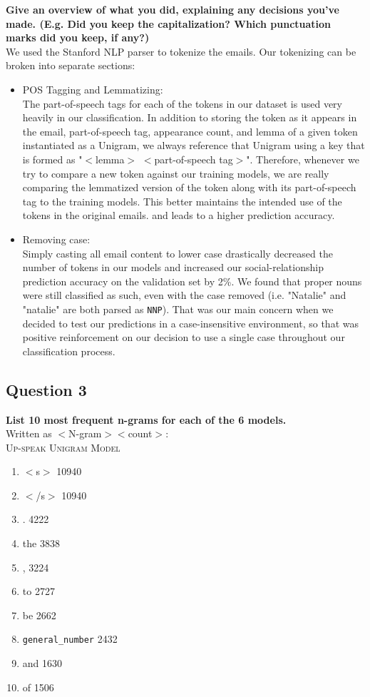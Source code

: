 \documentclass{article} %
\begin{document}
\textbf{Give an overview of what you did, explaining any decisions you've made. (E.g. Did you keep the capitalization? Which punctuation marks did you keep, if any?)}
\\


We used the Stanford NLP parser to tokenize the emails. Our tokenizing can be broken into separate sections:\\
\begin{itemize}
\item POS Tagging and Lemmatizing:\\
The part-of-speech tags for each of the tokens in our dataset is used very heavily in our classification. In addition to storing the token as it appears in the email, part-of-speech tag, appearance count, and lemma of a given token instantiated as a Unigram, we always reference that Unigram using a key that is formed as "$<$lemma$>$ $<$part-of-speech tag$>$". Therefore, whenever we try to compare a new token against our training models, we are really comparing the lemmatized version of the token along with its part-of-speech tag to the training models. This better maintains the intended use of the tokens in the original emails. and leads to a higher prediction accuracy.
\item Removing case:\\
Simply casting all email content to lower case drastically decreased the number of tokens in our models and increased our social-relationship prediction accuracy on the validation set by 2\%. We found that proper nouns were still classified as such, even with the case removed (i.e. "Natalie" and "natalie" are both parsed as \texttt{NNP}). That was our main concern when we decided to test our predictions in a case-insensitive environment, so that was positive reinforcement on our decision to use a single case throughout our classification process.
\end{itemize}

\subsection*{Question 3}

\textbf{List 10 most frequent n-grams for each of the 6 models.}
\\

Written as $<$N-gram$> <$count$>$:\\

\textsc{Up-speak Unigram Model}\\
\begin{enumerate}
\item $<$s$>$ 10940
\item $<$/s$>$ 10940
\item . 4222
\item the 3838
\item , 3224
\item to 2727
\item be 2662
\item \texttt{general\_number} 2432
\item and 1630
\item of 1506
\end{enumerate}
\end{document}
